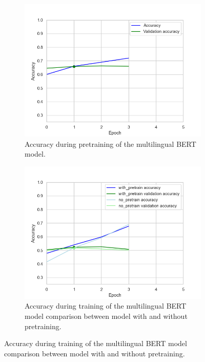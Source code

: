 \documentclass[acmsmall,nonacm]{acmart}
\begin{document}
\begin{figure}[H] 
  \begin{subfigure}[b]{0.4\linewidth}
    \includegraphics[width=\textwidth]{assets/bert-base-multilingual-cased_accuracy.png}
    \caption{Accuracy during pretraining of the multilingual BERT model.}
    \label{fig:multilingual_bert_model_pretrain}
    \vspace{2ex}
  \end{subfigure}%
  \hfill
  \begin{subfigure}[b]{0.4\linewidth}
    \includegraphics[width=\textwidth]{assets/bert-base-multilingual-cased_comparison_with_pretrain_no_pretrain.png}
    \caption{Accuracy during training of the multilingual BERT model comparison between model with and without pretraining.}

\end{subfigure}
\end{figure}
\end{document}
